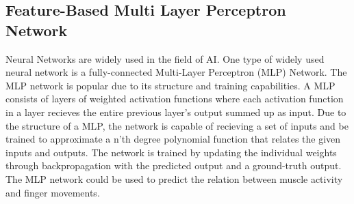 \documentclass[../main.tex]{subfiles}
\begin{document}
%
%
%
%
%
%
\subsection{Feature-Based Multi Layer Perceptron Network}

Neural Networks are widely used in the field of AI.
One type of widely used neural network is a fully-connected Multi-Layer Perceptron (MLP) Network.
The MLP network is popular due to its structure and training capabilities.
A MLP consists of layers of weighted activation functions where each activation function in a layer recieves the entire previous layer's output summed up as input.
Due to the structure of a MLP, the network is capable of recieving a set of inputs and be trained to approximate a n'th degree polynomial function that relates the given inputs and outputs.
The network is trained by updating the individual weights through backpropagation with the predicted output and a ground-truth output.
The MLP network could be used to predict the relation between muscle activity and finger movements.
\end{document}

